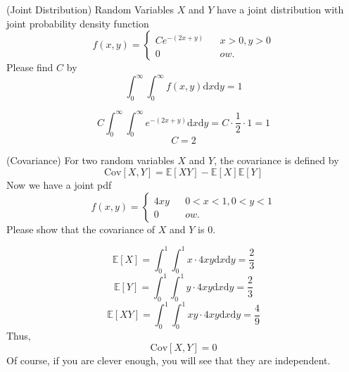 \documentclass[a4paper, 12pt, answers]{exam} %
\begin{document}
\begin{questions}
\begin{solution}
    \end{solution}
	\question (Joint Distribution) Random Variables $X$ and $Y$ have a joint distribution with joint probability density function
	\begin{equation*}
	f(x,y) = \left\{
	\begin{array}{rcl}
	Ce^{-(2x+y)}&   & x>0, y>0\\
	0\quad\quad & & ow.
	\end{array}\right.
	\end{equation*}
	Please find $C$ by 
	\begin{equation*}
	\int_0^\infty\int_0^\infty f(x,y)\mathrm{d}x\mathrm{d}y=1 
	\end{equation*}
	\begin{solution}
		\begin{equation*}
		C\int_0^\infty\int_0^\infty  e^{-(2x+y)}\mathrm{d}x\mathrm{d}y=C\cdot \frac 12 \cdot 1=1 
		\end{equation*}
		\begin{equation*}
		C = 2
		\end{equation*}
		
    \end{solution}
	
	\question (Covariance) For two random variables $X$ and $Y$, the covariance is defined by
	\begin{equation*}
	\mathrm{Cov}\left[X,Y\right]=\mathbb{E}\left[XY\right]-\mathbb{E}\left[X\right]\mathbb{E}\left[Y\right]
	\end{equation*}
	Now we have a joint pdf
	\begin{equation*}
	f(x,y) = \left\{
	\begin{array}{rcl}
	4xy&   & 0<x<1, 0<y<1\\
	0\quad & & ow.
	\end{array}\right.
	\end{equation*}
	Please show that the covariance of $X$ and $Y$ is $0$.
	\begin{solution}
		\begin{equation*}
		\mathbb{E}\left[X\right]=\int_0^1\int_0^1x\cdot 4xy\mathrm{d}x\mathrm{d}y=\frac 23
		\end{equation*}
		\begin{equation*}
		\mathbb{E}\left[Y\right]=\int_0^1\int_0^1y\cdot 4xy\mathrm{d}x\mathrm{d}y=\frac 23
		\end{equation*}
	    \begin{equation*}
		\mathbb{E}\left[XY\right]=\int_0^1\int_0^1xy\cdot 4xy\mathrm{d}x\mathrm{d}y=\frac 49
		\end{equation*}
		Thus,
		 \begin{equation*}
		\mathrm{Cov}\left[X,Y\right]=0
		\end{equation*}
		Of course, if you are clever enough, you will see that they are independent.
	\end{solution}
		


\end{questions}
\end{document}
